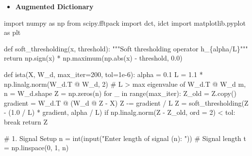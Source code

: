 \documentclass[
  letterpaper,
  DIV=11,
  numbers=noendperiod]{scrartcl}
\newenvironment{Shaded}{\begin{snugshade}}{\end{snugshade}}
\newcommand{\BuiltInTok}[1]{\textcolor[rgb]{0.40,0.85,0.94}{#1}}
\newcommand{\CommentTok}[1]{\textcolor[rgb]{0.46,0.44,0.37}{#1}}
\newcommand{\ControlFlowTok}[1]{\textcolor[rgb]{0.98,0.15,0.45}{#1}}
\newcommand{\DecValTok}[1]{\textcolor[rgb]{0.68,0.51,1.00}{#1}}
\newcommand{\FloatTok}[1]{\textcolor[rgb]{0.68,0.51,1.00}{#1}}
\newcommand{\ImportTok}[1]{\textcolor[rgb]{0.98,0.15,0.45}{#1}}
\newcommand{\KeywordTok}[1]{\textcolor[rgb]{0.98,0.15,0.45}{#1}}
\newcommand{\NormalTok}[1]{\textcolor[rgb]{0.97,0.97,0.95}{#1}}
\newcommand{\OperatorTok}[1]{\textcolor[rgb]{0.97,0.97,0.95}{#1}}
\newcommand{\StringTok}[1]{\textcolor[rgb]{0.90,0.86,0.45}{#1}}
\providecommand{\tightlist}{%
  \setlength{\itemsep}{0pt}\setlength{\parskip}{0pt}}
\begin{document}
\begin{itemize}
\tightlist
\item
  \textbf{Augmented Dictionary}
\end{itemize}

\begin{Shaded}
\begin{Highlighting}[]
\ImportTok{import}\NormalTok{ numpy }\ImportTok{as}\NormalTok{ np}
\ImportTok{from}\NormalTok{ scipy.fftpack }\ImportTok{import}\NormalTok{ dct, idct}
\ImportTok{import}\NormalTok{ matplotlib.pyplot }\ImportTok{as}\NormalTok{ plt}

\KeywordTok{def}\NormalTok{ soft\_thresholding(x, threshold):}
    \CommentTok{"""Soft thresholding operator h\_\{alpha/L\}"""}
    \ControlFlowTok{return}\NormalTok{ np.sign(x) }\OperatorTok{*}\NormalTok{ np.maximum(np.}\BuiltInTok{abs}\NormalTok{(x) }\OperatorTok{{-}}\NormalTok{ threshold, }\FloatTok{0.0}\NormalTok{)}

\KeywordTok{def}\NormalTok{ ista(X, W\_d, max\_iter}\OperatorTok{=}\DecValTok{200}\NormalTok{, tol}\OperatorTok{=}\FloatTok{1e{-}6}\NormalTok{):}
\NormalTok{    alpha }\OperatorTok{=} \FloatTok{0.1}
\NormalTok{    L }\OperatorTok{=} \FloatTok{1.1} \OperatorTok{*}\NormalTok{ np.linalg.norm(W\_d.T }\OperatorTok{@}\NormalTok{ W\_d, }\DecValTok{2}\NormalTok{)  }
    \CommentTok{\# L \textgreater{} max eigenvalue of W\_d.T @ W\_d}
\NormalTok{    m, n }\OperatorTok{=}\NormalTok{ W\_d.shape}
\NormalTok{    Z }\OperatorTok{=}\NormalTok{ np.zeros(n)}
    \ControlFlowTok{for}\NormalTok{ \_ }\KeywordTok{in} \BuiltInTok{range}\NormalTok{(max\_iter):}
\NormalTok{        Z\_old }\OperatorTok{=}\NormalTok{ Z.copy()}
\NormalTok{        gradient }\OperatorTok{=}\NormalTok{ W\_d.T }\OperatorTok{@}\NormalTok{ (W\_d }\OperatorTok{@}\NormalTok{ Z }\OperatorTok{{-}}\NormalTok{ X)}
\NormalTok{        Z }\OperatorTok{{-}=}\NormalTok{ gradient }\OperatorTok{/}\NormalTok{ L}
\NormalTok{        Z }\OperatorTok{=}\NormalTok{ soft\_thresholding(Z }\OperatorTok{{-}}\NormalTok{ (}\FloatTok{1.0} \OperatorTok{/}\NormalTok{ L) }\OperatorTok{*}\NormalTok{ gradient, alpha }\OperatorTok{/}\NormalTok{ L)}
        \ControlFlowTok{if}\NormalTok{ np.linalg.norm(Z }\OperatorTok{{-}}\NormalTok{ Z\_old, }\BuiltInTok{ord} \OperatorTok{=} \DecValTok{2}\NormalTok{) }\OperatorTok{\textless{}}\NormalTok{ tol:}
            \ControlFlowTok{break}
    \ControlFlowTok{return}\NormalTok{ Z}

\CommentTok{\# 1. Signal Setup}
\NormalTok{n }\OperatorTok{=} \BuiltInTok{int}\NormalTok{(}\BuiltInTok{input}\NormalTok{(}\StringTok{"Enter length of signal (n): "}\NormalTok{))  }\CommentTok{\# Signal length}
\NormalTok{t }\OperatorTok{=}\NormalTok{ np.linspace(}\DecValTok{0}\NormalTok{, }\DecValTok{1}\NormalTok{, n)}


\end{Highlighting}
\end{Shaded}
\end{document}
